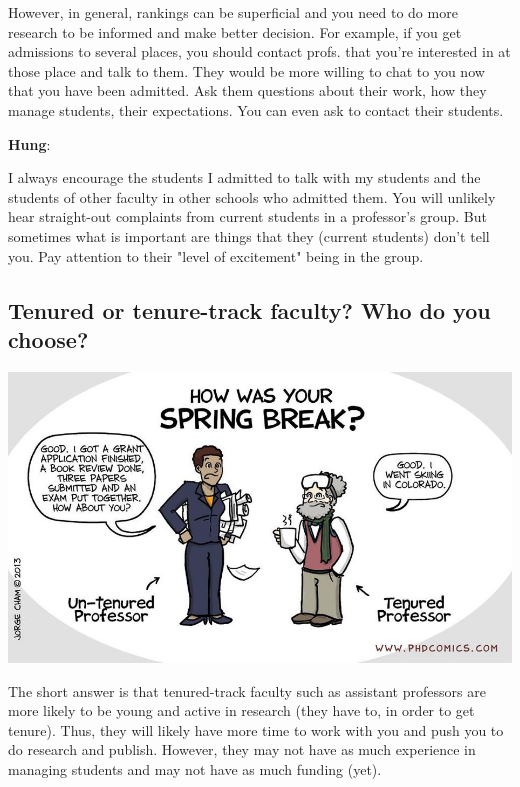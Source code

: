 \documentclass[11pt]{article}
\newenvironment{commentbox}[1][]{
\small
    \begin{cbox}
    \textbf{#1}: 
 }{
   \end{cbox}
}
\begin{document}
However, in general, rankings can be superficial and you need to do more research to be informed and make better decision. For example, if you get admissions to several places, you should contact profs. that you're interested in at those place and talk to them. They would be more willing to chat to you now that you have been admitted.  Ask them questions about their work, how they manage students, their expectations. You can even ask to contact their students.


\begin{commentbox}[Hung]
I always encourage the students I admitted to talk with my students and the students of other faculty in other schools who admitted them. You will unlikely hear straight-out complaints from current students in a professor’s group. But sometimes what is important are things that they (current students) don’t tell you. Pay attention to their "level of excitement" being in the group.
\end{commentbox}

\subsection{Tenured or tenure-track faculty? Who do you choose?}

      \begin{center}
        \includegraphics[scale=0.4]{c8.png}
      \end{center}

The short answer is that tenured-track faculty such as assistant professors are more likely to be young and active in research (they have to, in order to get tenure). Thus, they will likely have more time to work with you and push you to do research and publish. However, they may not have as much experience in managing students and may not have as much funding (yet).
\end{document}
